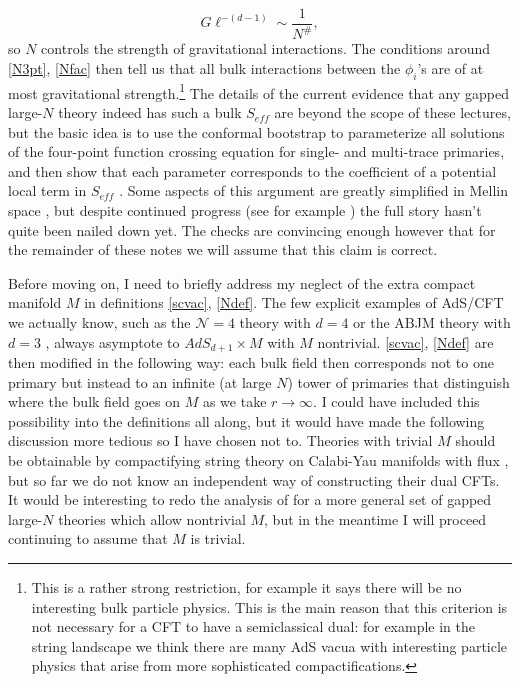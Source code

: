 \documentclass[toc]{PoS}
\newcommand{\be}{\begin{equation}}
\newcommand{\ee}{\end{equation}}
\begin{document}
\be\label{Geq}
G\ell^{-(d-1)}\sim \frac{1}{N^{\#}},
\ee
so $N$ controls the strength of gravitational interactions.  The conditions around \eqref{N3pt}, \eqref{Nfac} then tell us that all bulk interactions between the $\phi_i$'s are of at most gravitational strength.\footnote{This is a rather strong restriction, for example it says there will be no interesting bulk particle physics.  This is the main reason that this criterion is not necessary for a CFT to have a semiclassical dual: for example in the string landscape we think there are many AdS vacua with interesting particle physics that arise from more sophisticated compactifications.} The details of the current evidence that any gapped large-$N$ theory indeed has such a bulk $S_{eff}$ are beyond the scope of these lectures, but the basic idea is to use the conformal bootstrap to parameterize all solutions of the four-point function crossing equation for single- and multi-trace primaries, and then show that each parameter corresponds to the coefficient of a potential local term in $S_{eff}$ \cite{Heemskerk:2009pn}.  Some aspects of this argument are greatly simplified in Mellin space \cite{Penedones:2010ue}, but despite continued progress (see for example \cite{Aharony:2016dwx}) the full story hasn't quite been nailed down yet.  The checks are convincing enough however that for the remainder of these notes we will assume that this claim is correct.  

Before moving on, I need to briefly address my neglect of the extra compact manifold $M$ in definitions \eqref{scvac}, \eqref{Ndef}. The few explicit examples of AdS/CFT we actually know, such as the $\mathcal{N}=4$ theory with $d=4$ or the ABJM theory with $d=3$ \cite{Aharony:2008ug}, always asymptote to $AdS_{d+1}\times M$ with $M$ nontrivial.  \eqref{scvac}, \eqref{Ndef} are then modified in the following way: each bulk field then corresponds not to one primary but instead to an infinite (at large $N$) tower of primaries that distinguish where the bulk field goes on $M$ as we take $r\to\infty$.  I could have included this possibility into the definitions all along, but it would have made the following discussion more tedious so I have chosen not to.  Theories with trivial $M$ should be obtainable by compactifying string theory on Calabi-Yau manifolds with flux \cite{Klebanov:2000hb,Giddings:2001yu,Kachru:2003aw}, but so far we do not know an independent way of constructing their dual CFTs.  It would be interesting to redo the analysis of \cite{Heemskerk:2009pn,Penedones:2010ue} for a more general set of gapped large-$N$ theories which allow nontrivial $M$, but in the meantime I will proceed continuing to assume that $M$ is trivial.
\end{document}
